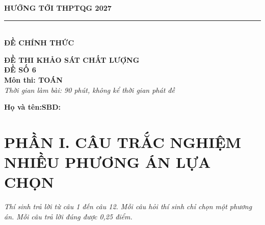 \documentclass[12pt,a4paper]{article}
\begin{document}
\noindent
\begin{minipage}[t]{0.40\textwidth}
    \centering
    \textbf{HƯỚNG TỚI THPTQG 2027}\\[-2pt]
    \rule{3.2cm}{0.6pt}\\[4pt]
    \textbf{ĐỀ CHÍNH THỨC}
\end{minipage}\hfill
\begin{minipage}[t]{0.58\textwidth}
    \centering
    \textbf{ĐỀ THI KHẢO SÁT CHẤT LƯỢNG}\\
    \textbf{ĐỀ SỐ 6}\\
    \textbf{Môn thi: TOÁN}\\
    \textit{\small Thời gian làm bài: 90 phút, không kể thời gian phát đề}
\end{minipage}

\vspace{0.2cm}
\noindent
\begin{minipage}[b]{0.78\textwidth}
    \textbf{Họ và tên:}\dotfill\textbf{SBD:}\makebox[3.5cm]{\dotfill}
\end{minipage}\hfill
\begin{minipage}[b]{0.20\textwidth}
    \hfill
    \setlength{\fboxrule}{0.8pt}%
\end{minipage}
\vspace{0.2cm}

\section*{\large PHẦN I. CÂU TRẮC NGHIỆM NHIỀU PHƯƠNG ÁN LỰA CHỌN}
\textit{Thí sinh trả lời từ câu 1 đến câu 12. Mỗi câu hỏi thí sinh chỉ chọn một phương án. Mỗi câu trả lời đúng được 0,25 điểm.}
\end{document}
